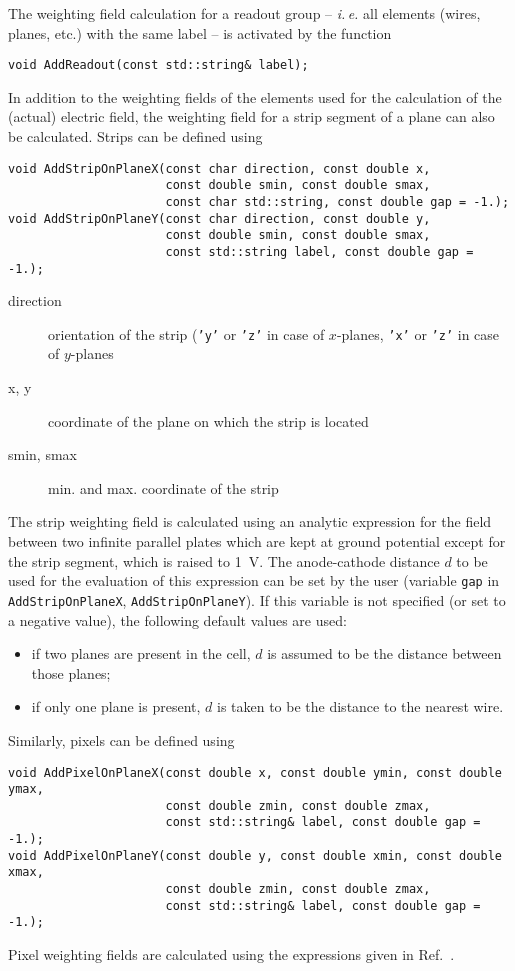 The weighting field calculation for a readout group 
-- \textit{i.\,e.} all elements (wires, planes, etc.) with the same label --
is activated by the function
\begin{lstlisting}
void AddReadout(const std::string& label);
\end{lstlisting}
In addition to the weighting fields of 
the elements used for the calculation of the 
(actual) electric field, 
the weighting field for a strip segment of a plane 
can also be calculated. 
Strips can be defined using
\begin{lstlisting}
void AddStripOnPlaneX(const char direction, const double x,
                      const double smin, const double smax,
                      const char std::string, const double gap = -1.);
void AddStripOnPlaneY(const char direction, const double y,
                      const double smin, const double smax,
                      const std::string label, const double gap = -1.);
\end{lstlisting} 
\begin{description}
  \item[direction]
  orientation of the strip (\texttt{'y'} or \texttt{'z'} 
  in case of \(x\)-planes, \texttt{'x'} or \texttt{'z'} 
  in case of \(y\)-planes
  \item[x, y] coordinate of the plane on which the strip is located
  \item[smin, smax] min. and max. coordinate of the strip
\end{description}
The strip weighting field is calculated using an analytic expression for  
the field between two infinite parallel plates which are kept at 
ground potential except for the strip segment, which is raised to 1~V.
The anode-cathode distance \(d\) to be used for the evaluation of this 
expression can be set by the user (variable \texttt{gap} in 
\texttt{AddStripOnPlaneX}, \texttt{AddStripOnPlaneY}). 
If this variable is not specified (or set to a negative value), 
the following default values are used:
\begin{itemize}
  \item
  if two planes are present in the cell, \(d\) is  
  assumed to be the distance between those planes;
  \item
  if only one plane is present, \(d\) is taken to be 
  the distance to the nearest wire.
\end{itemize}

Similarly, pixels can be defined using
\begin{lstlisting}
void AddPixelOnPlaneX(const double x, const double ymin, const double ymax,
                      const double zmin, const double zmax,
                      const std::string& label, const double gap = -1.);
void AddPixelOnPlaneY(const double y, const double xmin, const double xmax,
                      const double zmin, const double zmax,
                      const std::string& label, const double gap = -1.);
\end{lstlisting}
Pixel weighting fields are calculated using the expressions given in 
Ref.~\cite{Riegler2014}.

